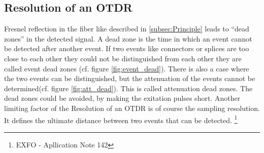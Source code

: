 \subsection{Resolution of an OTDR}
\label{sec:resolution}
\begin{figure}[h]%
\centering
	\qquad
\caption{}%
\label{fig:dead}
\end{figure}



Fresnel reflection in the fiber like described in \ref{subsec:Principle} leads to ``dead zones'' in the detected signal. A dead zone is the time in which an event cannot be detected after another event. If two events like connectors or splices are too close to each other they could not be distinguished from each other they are called event dead zones (cf. figure \ref{fig:event_dead}). There is also a case where the two events can be distinguished, but the attenuation of the events cannot be determined(cf. figure \ref{fig:att_dead}). This is called attenuation dead zones. The dead zones could be avoided, by making the exitation pulses short. Another limiting factor of the Resolution of an OTDR is of course the sampling resolution. It defines the ultimate distance between two events that can be detected. \footnote[3]{EXFO - Apllication Note 142}






